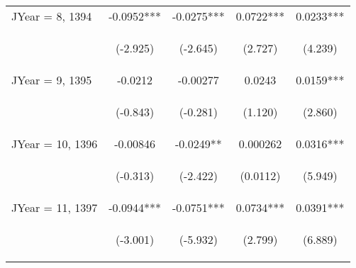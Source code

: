 \documentclass[]{article}
\begin{document}
\begin{center}
\begin{tabular}{lcccc}
JYear = 8, 1394 & -0.0952*** & -0.0275*** & 0.0722*** & 0.0233*** \\
\vspace{4pt} & \begin{footnotesize}(-2.925)\end{footnotesize} & \begin{footnotesize}(-2.645)\end{footnotesize} & \begin{footnotesize}(2.727)\end{footnotesize} & \begin{footnotesize}(4.239)\end{footnotesize} \\
JYear = 9, 1395 & -0.0212 & -0.00277 & 0.0243 & 0.0159*** \\
\vspace{4pt} & \begin{footnotesize}(-0.843)\end{footnotesize} & \begin{footnotesize}(-0.281)\end{footnotesize} & \begin{footnotesize}(1.120)\end{footnotesize} & \begin{footnotesize}(2.860)\end{footnotesize} \\
JYear = 10, 1396 & -0.00846 & -0.0249** & 0.000262 & 0.0316*** \\
\vspace{4pt} & \begin{footnotesize}(-0.313)\end{footnotesize} & \begin{footnotesize}(-2.422)\end{footnotesize} & \begin{footnotesize}(0.0112)\end{footnotesize} & \begin{footnotesize}(5.949)\end{footnotesize} \\
JYear = 11, 1397 & -0.0944*** & -0.0751*** & 0.0734*** & 0.0391*** \\
\vspace{4pt} & \begin{footnotesize}(-3.001)\end{footnotesize} & \begin{footnotesize}(-5.932)\end{footnotesize} & \begin{footnotesize}(2.799)\end{footnotesize} & \begin{footnotesize}(6.889)\end{footnotesize} \\

\end{tabular}
\end{center}
\end{document}
